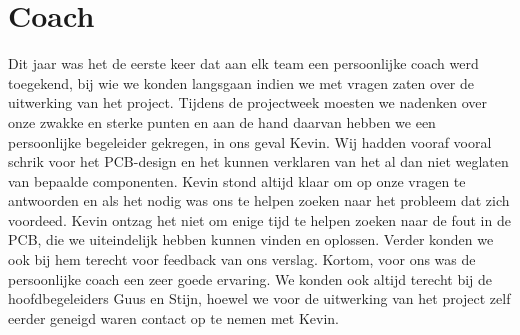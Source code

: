 \chapter{Coach}
Dit jaar was het de eerste keer dat aan elk team een persoonlijke coach werd toegekend, bij wie we konden langsgaan indien we met vragen zaten over de uitwerking van het project. Tijdens de projectweek moesten we nadenken over onze zwakke en sterke punten en aan de hand daarvan hebben we een persoonlijke begeleider gekregen, in ons geval Kevin. Wij hadden vooraf vooral schrik voor het PCB-design en het kunnen verklaren van het al dan niet weglaten van bepaalde componenten. Kevin stond altijd klaar om op onze vragen te antwoorden en als het nodig was ons te helpen zoeken naar het probleem dat zich voordeed. Kevin ontzag het niet om enige tijd te helpen zoeken naar de fout in de PCB, die we uiteindelijk hebben kunnen vinden en oplossen. Verder konden we ook bij hem terecht voor feedback van ons verslag. Kortom, voor ons was de persoonlijke coach een zeer goede ervaring. We konden ook altijd terecht bij de hoofdbegeleiders Guus en Stijn, hoewel we voor de uitwerking van het project zelf eerder geneigd waren contact op te nemen met Kevin.